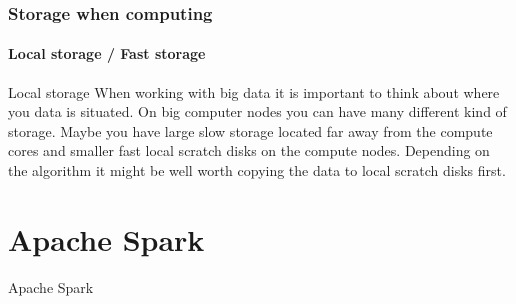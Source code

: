 \documentclass[aspectratio=169,dvipsnames]{beamer}
\begin{document}
    \begin{frame}
        \frametitle{Storage when computing}
        \framesubtitle{Local storage / Fast storage}
        \begin{block}{Local storage}
        When working with big data it is important to think about where you
        data is situated. On big computer nodes you can have many different
        kind of storage. Maybe you have large slow storage located far away
        from the compute cores and smaller fast local scratch disks on the
        compute nodes. Depending on the algorithm it \alert{might be well worth
        copying the data to local scratch disks} first.
        \end{block}
    \end{frame}

\section{Apache Spark}
\begin{frame}[plain]
\hfill\LARGE Apache Spark \hfill\normalsize
\end{frame}
\end{document}
